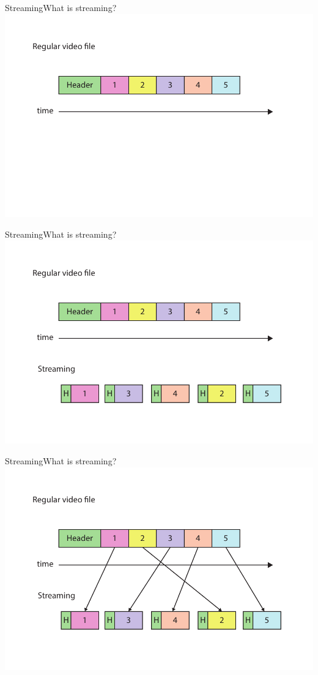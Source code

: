 \begin{frame}{Streaming}{What is streaming?}
  \includegraphics[width=1\textwidth]{images/file_vs_stream1.pdf}
\end{frame}

\begin{frame}{Streaming}{What is streaming?}
  \includegraphics[width=1\textwidth]{images/file_vs_stream2.pdf}
\end{frame}

\begin{frame}{Streaming}{What is streaming?}
  \includegraphics[width=1\textwidth]{images/file_vs_stream3.pdf}
\end{frame}

